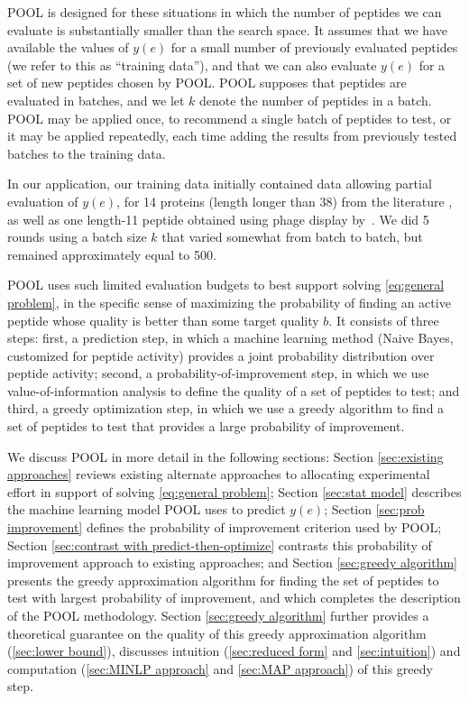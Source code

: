 POOL is designed for these situations in which the number of peptides we can evaluate is substantially smaller than the search space.  
It assumes that we have available the values of $y(e)$ for a small number of previously evaluated peptides (we refer to this as ``training data''), and that we can also evaluate $y(e)$ for a set of new peptides chosen by POOL.  POOL supposes that peptides are evaluated in batches, and we let $k$ denote the number of peptides in a batch.  POOL may be applied once, to recommend a single batch of peptides to test, or it may be applied repeatedly, each time adding the results from previously tested batches to the training data.

In our application, our training data initially contained data allowing partial evaluation of $y(e)$, for 14 proteins (length longer than 38) from the literature , as well as one length-11 peptide obtained using phage display by~\cite{yin2005genetically}.
We did 5 rounds using a batch size $k$ that varied somewhat from batch to batch, but remained approximately equal to 500.

POOL uses such limited evaluation budgets to best support solving \eqref{eq:general problem}, in the specific sense of maximizing the probability of finding an active peptide whose quality is better than some target quality $b$.
It consists of three steps: first, a prediction step, in which a machine learning method (Naive Bayes, customized for peptide activity) provides a joint probability distribution over peptide activity; second, a probability-of-improvement step, in which we use value-of-information analysis to define the quality of a set of peptides to test; and third, a greedy optimization step, in which we use a greedy algorithm to find a set of peptides to test that provides a large probability of improvement.


We discuss POOL in more detail in the following sections: Section \ref{sec:existing approaches} reviews existing alternate approaches to allocating experimental effort in support of solving \eqref{eq:general problem}; Section \ref{sec:stat model} describes the machine learning model POOL uses to predict $y(e)$; Section \ref{sec:prob improvement} defines the probability of improvement criterion used by POOL; Section \ref{sec:contrast with predict-then-optimize} contrasts this probability of improvement approach to existing approaches; and Section \ref{sec:greedy algorithm}
presents the greedy approximation algorithm for finding the set of peptides to test with largest probability of improvement, and which completes the description of the POOL methodology.
Section \ref{sec:greedy algorithm} further provides a theoretical guarantee on the quality of this greedy approximation algorithm (\ref{sec:lower bound}), discusses intuition (\ref{sec:reduced form} and \ref{sec:intuition}) and computation (\ref{sec:MINLP approach} and \ref{sec:MAP approach}) of this greedy step.

